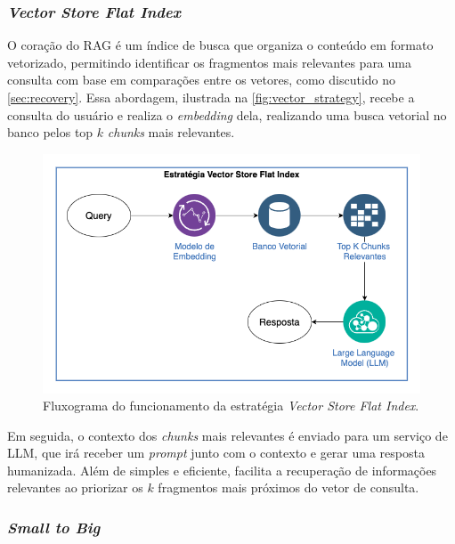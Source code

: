 \documentclass[a4paper, 12pt]{article}
\begin{document}
    \subsubsection{\textit{Vector Store Flat Index}} \label{sec:vector_search}

    O coração do RAG é um índice de busca que organiza o conteúdo em formato vetorizado, permitindo identificar os fragmentos mais relevantes para uma consulta com base em comparações entre os vetores, como discutido no \autoref{sec:recovery}. Essa abordagem, ilustrada na \autoref{fig:vector_strategy}, recebe a consulta do usuário e realiza o \textit{embedding} dela, realizando uma busca vetorial no banco pelos top $k$ \textit{chunks} mais relevantes. 

    \clearpage

    \begin{figure}[ht]
        \includegraphics[width=\textwidth,height=0.9\textheight,keepaspectratio]{vector-strategy.png}
        \centering
        \caption{Fluxograma do funcionamento da estratégia \textit{Vector Store Flat Index}.}
        \centering
        \label{fig:vector_strategy}
    \end{figure}

    Em seguida, o contexto dos \textit{chunks} mais relevantes é enviado para um serviço de LLM, que irá receber um \textit{prompt} junto com o contexto e gerar uma resposta humanizada. Além de simples e eficiente, facilita a recuperação de informações relevantes ao priorizar os $k$ fragmentos mais próximos do vetor de consulta.

    \subsubsection{\textit{Small to Big}} \label{sec:small_to_big_search}
\end{document}
